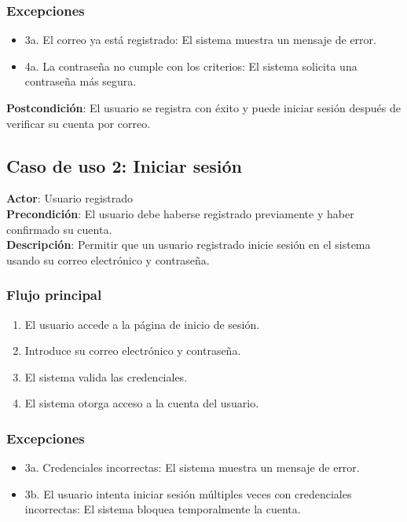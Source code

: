 \documentclass{scrreprt}
\begin{document}
\subsubsection{Excepciones}
\begin{itemize}
    \item 3a. El correo ya está registrado: El sistema muestra un mensaje de error.
    \item 4a. La contraseña no cumple con los criterios: El sistema solicita una contraseña más segura.
\end{itemize}

\textbf{Postcondición}: El usuario se registra con éxito y puede iniciar sesión después de verificar su cuenta por correo.

\subsection{Caso de uso 2: Iniciar sesión}
\textbf{Actor}: Usuario registrado \\
\textbf{Precondición}: El usuario debe haberse registrado previamente y haber confirmado su cuenta. \\
\textbf{Descripción}: Permitir que un usuario registrado inicie sesión en el sistema usando su correo electrónico y contraseña.

\subsubsection{Flujo principal}
\begin{enumerate}
    \item El usuario accede a la página de inicio de sesión.
    \item Introduce su correo electrónico y contraseña.
    \item El sistema valida las credenciales.
    \item El sistema otorga acceso a la cuenta del usuario.
\end{enumerate}

\subsubsection{Excepciones}
\begin{itemize}
    \item 3a. Credenciales incorrectas: El sistema muestra un mensaje de error.
    \item 3b. El usuario intenta iniciar sesión múltiples veces con credenciales incorrectas: El sistema bloquea temporalmente la cuenta.
\end{itemize}
\end{document}
